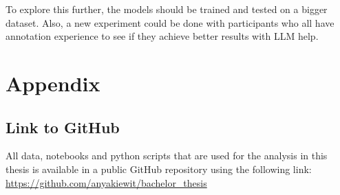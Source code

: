 \documentclass[
10pt, %
a4paper, %
oneside, %
headinclude,footinclude, %
] {book}%
\begin{document}
To explore this further, the models should be trained and tested on a bigger dataset. Also, a new experiment could be done with participants who all have annotation experience to see if they achieve better results with LLM help. 



 


\appendix
\chapter{Appendix}
\section{Link to GitHub}
\label{sec:link_github}
All data, notebooks and python scripts that are used for the analysis in this thesis is available in a public GitHub repository using the following link: 
\url{https://github.com/anyakiewit/bachelor_thesis}
\end{document}
